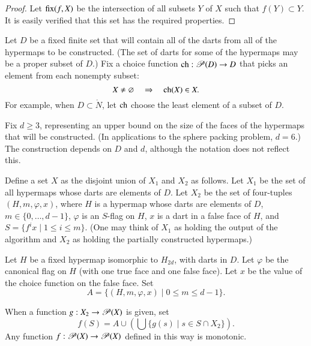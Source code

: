 \begin{proof} Let ${\operatorname{fix}}(f,X)$ be the intersection of all subsets
$Y$ of $X$ such that $f(Y)\subset Y$.  It is easily verified that
this set has the required properties.
\end{proof}


Let $D$ be a fixed finite set that will contain all of the darts from
all of the hypermaps to be constructed.  (The set of darts for some of
the hypermaps may be a proper subset of $D$.)  Fix a choice function
${\operatorname{ch}}:{\mathscr P}(D)\to D$ that picks an element from each nonempty
subset:
\begin{displaymath}
X\ne\varnothing\quad  \Rightarrow \quad  {\operatorname{ch}}(X)\in X.
\end{displaymath}
 For example, when
$D\subset\ring{N}$, let ${\operatorname{ch}}$ choose the least element of a subset
of $D$.

Fix $d\ge 3$, representing an upper bound on the size of the faces of
the hypermaps that will be constructed.  (In applications to the
sphere packing problem, $d=6$.)  The construction depends on $D$ and
$d$, although the notation does not reflect this.
%

Define a set $X$ as the disjoint union of $X_1$ and $X_2$ as follows.
Let $X_1$ be the set of all hypermaps whose darts are elements of $D$.
Let $X_2$ be the set of four-tuples $(H,m,\varphi,x)$, where $H$ is a
hypermap whose darts are elements of $D$, $m\in\{0,\ldots,d-1\}$,
$\varphi$ is an $S$-flag on $H$, $x$ is a dart in a false face of $H$,
and $S = \{f^i x\mid 1 \le i \le m\}$.  (One may think of $X_1$ as
holding the output of the algorithm and $X_2$ as holding the partially
constructed hypermaps.)

Let $H$ be a fixed hypermap isomorphic to $H_{2d}$, with darts in $D$.
Let $\varphi$ be the canonical flag on $H$ (with one true face and one
false face).  Let $x$ be the value of the choice function on the false
face.  Set
\begin{displaymath}A = \{(H,m,\varphi,x) \mid 0\le m \le d-1
\}.\end{displaymath}

When a function 
$g:X_2 \to {\mathscr P}(X)$ is given, set 
\begin{displaymath}f(S) = A \cup (\bigcup \{g(s) \mid s\in S\cap
X_2\}).\end{displaymath} Any function $f :{\mathscr P}(X)\to
{\mathscr P}(X)$ defined in this way is monotonic.  %

